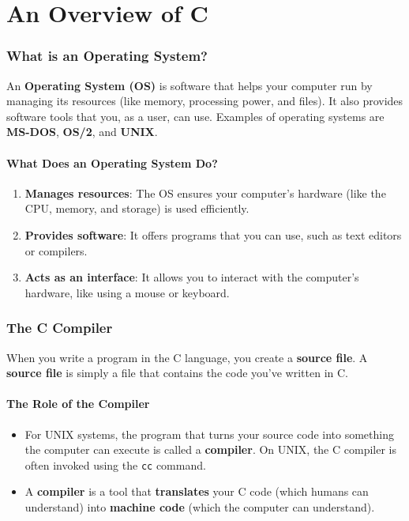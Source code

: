 \documentclass{article}
\begin{document}
\chapter{An Overview of C}
\subsection{What is an Operating System?}

An \textbf{Operating System (OS)} is software that helps your computer run by managing its resources (like memory, processing power, and files). It also provides software tools that you, as a user, can use. Examples of operating systems are \textbf{MS-DOS}, \textbf{OS/2}, and \textbf{UNIX}.

\subsubsection{What Does an Operating System Do?}

\begin{enumerate}
    \item \textbf{Manages resources}: The OS ensures your computer's hardware (like the CPU, memory, and storage) is used efficiently.
    \item \textbf{Provides software}: It offers programs that you can use, such as text editors or compilers.
    \item \textbf{Acts as an interface}: It allows you to interact with the computer’s hardware, like using a mouse or keyboard.
\end{enumerate}

\subsection{The C Compiler}

When you write a program in the C language, you create a \textbf{source file}. A \textbf{source file} is simply a file that contains the code you've written in C.

\subsubsection{The Role of the Compiler}

\begin{itemize}
    \item For UNIX systems, the program that turns your source code into something the computer can execute is called a \textbf{compiler}. On UNIX, the C compiler is often invoked using the \texttt{cc} command.
    \item A \textbf{compiler} is a tool that \textbf{translates} your C code (which humans can understand) into \textbf{machine code} (which the computer can understand).
\end{itemize}
\end{document}
